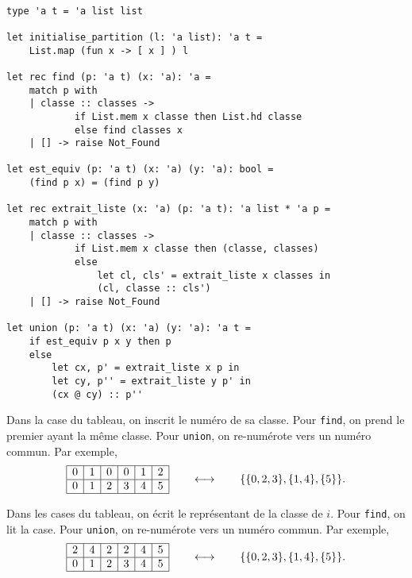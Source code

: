 \begin{rmk}~
	\begin{lstlisting}[language=caml,caption=Implémentation du type \textsf{UnionFind} en \textsc{OCaml}]
type 'a t = 'a list list

let initialise_partition (l: 'a list): 'a t =
	List.map (fun x -> [ x ] ) l

let rec find (p: 'a t) (x: 'a): 'a =
	match p with
	| classe :: classes ->
			if List.mem x classe then List.hd classe
			else find classes x
	| [] -> raise Not_Found

let est_equiv (p: 'a t) (x: 'a) (y: 'a): bool = 
	(find p x) = (find p y)

let rec extrait_liste (x: 'a) (p: 'a t): 'a list * 'a p =
	match p with
	| classe :: classes ->
			if List.mem x classe then (classe, classes)
			else
				let cl, cls' = extrait_liste x classes in
				(cl, classe :: cls')
	| [] -> raise Not_Found

let union (p: 'a t) (x: 'a) (y: 'a): 'a t =
	if est_equiv p x y then p
	else
		let cx, p' = extrait_liste x p in
		let cy, p'' = extrait_liste y p' in
		(cx @ cy) :: p''
	\end{lstlisting}
\end{rmk}

\begin{rmk}
	Dans la case du tableau, on inscrit le numéro de sa classe.
	Pour \texttt{find}, on prend le premier ayant la même classe.
	Pour \texttt{union}, on re-numérote vers un numéro commun.
	Par exemple, \[
		\begin{array}{|c|c|c|c|c|c|}
			\hline
			0 & 1 & 0 & 0 & 1 & 2\\ \hline
			0 & 1 & 2 & 3 & 4 & 5 \\ \hline
		\end{array}\quad\quad\longleftrightarrow\quad\quad\{\{0,2,3\},\{1,4\},\{5\}\}
	.\]
\end{rmk}

\begin{rmk}
	Dans les cases du tableau, on écrit le représentant de la classe de $i$.
	Pour \texttt{find}, on lit la case.
	Pour \texttt{union}, on re-numérote vers un numéro commun.
	Par exemple, \[
		\begin{array}{|c|c|c|c|c|c|}
			\hline
			2 & 4 & 2 & 2 & 4 & 5\\ \hline
			0 & 1 & 2 & 3 & 4 & 5 \\ \hline
		\end{array}\quad\quad\longleftrightarrow\quad\quad\{\{0,2,3\},\{1,4\},\{5\}\}
	.\]
\end{rmk}

